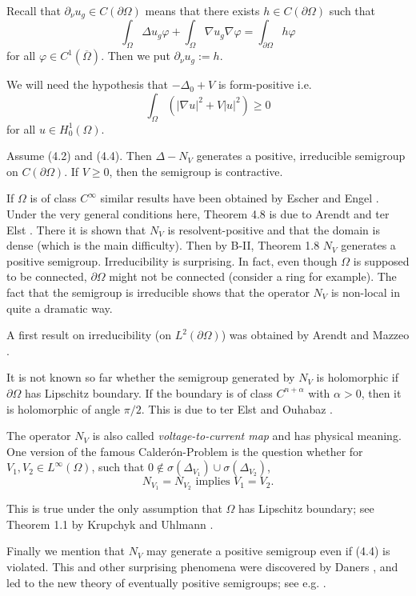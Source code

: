 Recall that $\partial_\nu u_g \in C(\partial\Omega)$ means that there exists $h \in C(\partial\Omega)$ such that
\[\int_\Omega \Delta u_g \varphi + \int_\Omega \nabla u_g \nabla\varphi = \int_{\partial\Omega} h\varphi\]
for all $\varphi \in C^1(\overline{\Omega})$. Then we put $\partial_\nu u_g := h$.

We will need the hypothesis that $-\Delta_0 + V$ is form-positive i.e.
\begin{equation} \tag{4.4}
\int_\Omega (|\nabla u|^2 + V|u|^2) \geq 0
\end{equation}
for all $u \in H^1_0(\Omega)$.

\begin{theorem}
Assume (4.2) and (4.4). Then $\Delta - N_{V}$ generates a positive, irreducible semigroup on $C(\partial\Omega)$. If $V \geq 0$, then the semigroup is contractive.
\end{theorem}

If $\Omega$ is of class $C^\infty$ similar results have been obtained by Escher \cite{Es94} and Engel \cite{En03}. 
Under the very general conditions here, Theorem 4.8 is due to Arendt and ter Elst \cite{AtE20}. There it is shown that $N_V$ is resolvent-positive and that the domain is dense (which is the main difficulty). 
Then by B-II, Theorem 1.8 $N_V$ generates a positive semigroup. 
Irreducibility is surprising. 
In fact, even though $\Omega$ is supposed to be connected, $\partial\Omega$ might not be connected (consider a ring for example). 
The fact that the semigroup is irreducible shows that the operator $N_V$ is non-local in quite a dramatic way.

A first result on irreducibility (on $L^2(\partial\Omega)$) was obtained by Arendt and Mazzeo \cite{AM12}.

It is not known so far whether the semigroup generated by $N_V$ is holomorphic if $\partial\Omega$ has Lipschitz boundary. If the boundary is of class $C^{n+\alpha}$ with $\alpha > 0$, then it is holomorphic of angle $\pi/2$. This is due to ter Elst and Ouhabaz \cite{tEO19}.

The operator $N_V$ is also called \emph{voltage-to-current map} and has physical meaning. 
One version of the famous Calderón-Problem is the question whether for $V_1, V_2 \in L^\infty(\Omega)$, such that $0 \notin \sigma(\Delta_{V_1}) \cup \sigma(\Delta_{V_2})$,
\[N_{V_1} = N_{V_2} \text{ implies } V_1 = V_2.\]

This is true under the only assumption that $\Omega$ has Lipschitz boundary; see Theorem 1.1 by Krupchyk and Uhlmann \cite{KU14}.

Finally we mention that $N_V$ may generate a positive semigroup even if (4.4) is violated. This and other surprising phenomena were discovered by Daners \cite{Da14}, and led to the new theory of eventually positive semigroups; see e.g. \cite{DEK16}.

